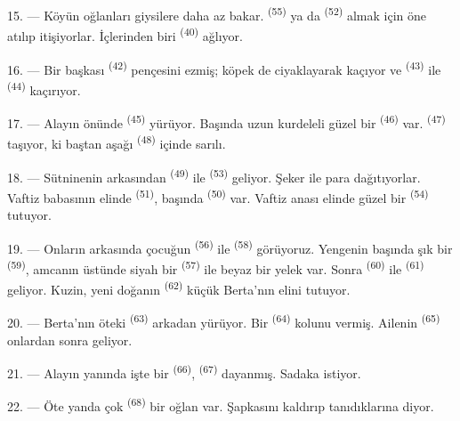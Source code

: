 15. --- Köyün oğlanları giysilere daha az bakar. 
\textsuperscript{(55)} ya da  \textsuperscript{(52)} almak
için öne atılıp itişiyorlar. İçlerinden biri \textsuperscript{(40)} ağlıyor.

16. --- Bir başkası  \textsuperscript{(42)} pençesini ezmiş;
köpek de ciyaklayarak kaçıyor ve  \textsuperscript{(43)} ile
 \textsuperscript{(44)} kaçırıyor.

\VUsaut{5.0mm}
\VUsaut{4.0mm}

17. --- Alayın önünde  \textsuperscript{(45)} yürüyor. Başında
uzun kurdeleli güzel bir  \textsuperscript{(46)} var.
 \textsuperscript{(47)} taşıyor, ki baştan aşağı
 \textsuperscript{(48)} içinde sarılı.

18. --- Sütninenin arkasından  \textsuperscript{(49)} ile
 \textsuperscript{(53)} geliyor. Şeker ile para
dağıtıyorlar. Vaftiz babasının elinde 
\textsuperscript{(51)}, başında 
\textsuperscript{(50)} var. Vaftiz anası elinde güzel bir 
\textsuperscript{(54)} tutuyor.

19. --- Onların arkasında çocuğun  \textsuperscript{(56)} ile
 \textsuperscript{(58)} görüyoruz. Yengenin başında şık bir
 \textsuperscript{(59)}, amcanın üstünde siyah bir
 \textsuperscript{(57)} ile beyaz bir yelek var. Sonra
 \textsuperscript{(60)} ile  \textsuperscript{(61)}
geliyor. Kuzin, yeni doğanın  \textsuperscript{(62)} küçük
Berta'nın elini tutuyor.

20. --- Berta'nın öteki  \textsuperscript{(63)} arkadan
yürüyor. Bir  \textsuperscript{(64)} kolunu vermiş. Ailenin
 \textsuperscript{(65)} onlardan sonra geliyor.

\VUsaut{4.6mm}
\VUsaut{3.4mm}

21. --- Alayın yanında işte bir  \textsuperscript{(66)},
 \textsuperscript{(67)} dayanmış. Sadaka istiyor.

22. --- Öte yanda çok  \textsuperscript{(68)} bir oğlan var.
Şapkasını kaldırıp tanıdıklarına  diyor.

